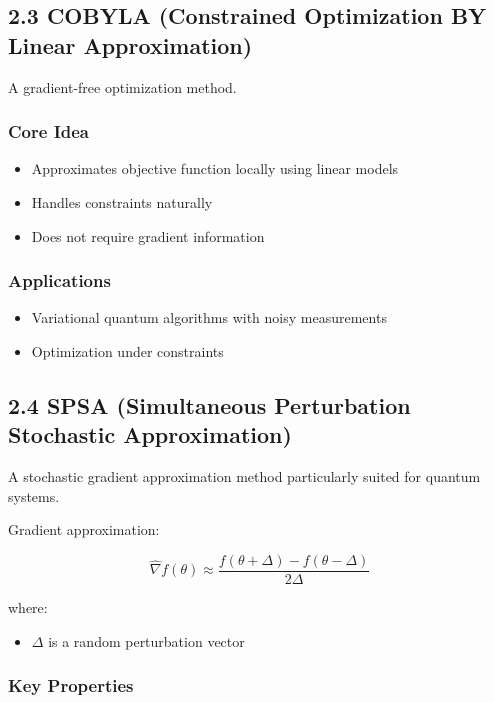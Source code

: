 \vspace{0.3cm}

\subsection*{2.3 COBYLA (Constrained Optimization BY Linear Approximation)}

A gradient-free optimization method.

\subsubsection*{Core Idea}

\begin{itemize}
\item Approximates objective function locally using linear models
\item Handles constraints naturally
\item Does not require gradient information
\end{itemize}

\subsubsection*{Applications}

\begin{itemize}
\item Variational quantum algorithms with noisy measurements
\item Optimization under constraints
\end{itemize}

\vspace{0.3cm}

\subsection*{2.4 SPSA (Simultaneous Perturbation Stochastic Approximation)}

A stochastic gradient approximation method particularly suited for quantum systems.

Gradient approximation:

\[
\hat{\nabla} f(\theta) \approx \frac{f(\theta + \Delta) - f(\theta - \Delta)}{2\Delta}
\]

where:
\begin{itemize}
\item $\Delta$ is a random perturbation vector
\end{itemize}

\subsubsection*{Key Properties}


